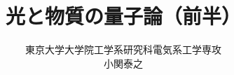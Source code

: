 \documentclass[a4paper, report]{jsbook}
\begin{document}
\title{光と物質の量子論（前半）\\}
\author{東京大学大学院工学系研究科電気系工学専攻\\小関泰之}
\frontmatter
\maketitle

	

\tableofcontents
\mainmatter







\end{document}
